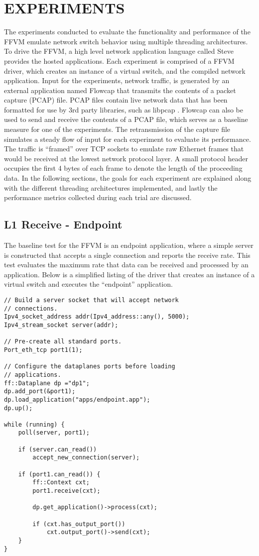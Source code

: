 \chapter{EXPERIMENTS}
\label{expr}
The experiments conducted to evaluate the functionality and performance of
the FFVM emulate network switch behavior using multiple threading architectures.
To drive the FFVM, a high level network application language called Steve
\cite{steve, steve2}
provides the hosted applications. Each experiment is comprised of a FFVM
driver, which creates an instance of a virtual switch, and the compiled network
application. Input for the experiments, network traffic, is generated by an
external application named Flowcap that transmits the contents of a packet
capture (PCAP) file. PCAP files contain live network data that has been
formatted for use by 3rd party libraries, such as libpcap \cite{pcap}.
Flowcap can also be used to send and receive the contents of a PCAP file,
which serves
as a baseline measure for one of the experiments. The retransmission of
the capture file simulates a steady flow of input for each experiment to
evaluate its performance. The traffic is ``framed'' over TCP sockets to
emulate raw Ethernet frames that would be received at the lowest network
protocol layer. A small protocol header occupies the first 4 bytes of each
frame to denote the length of the proceeding data. In the following sections,
the goals for each experiment are explained along with the different threading
architectures implemented, and lastly the performance metrics collected during
each trial are discussed.

\section{L1 Receive - Endpoint}
\label{expr:endpoint}
The baseline test for the FFVM is an endpoint application, where a simple
server is constructed that accepts a single connection and reports the
receive rate. This test evaluates the maximum rate that data can be received
and processed by an application. Below is a simplified listing of the driver
that creates an instance of a virtual switch and executes the ``endpoint''
application.

\begin{lstlisting}
// Build a server socket that will accept network
// connections.
Ipv4_socket_address addr(Ipv4_address::any(), 5000);
Ipv4_stream_socket server(addr);

// Pre-create all standard ports.
Port_eth_tcp port1(1);

// Configure the dataplanes ports before loading
// applications.
ff::Dataplane dp ="dp1";
dp.add_port(&port1);
dp.load_application("apps/endpoint.app");
dp.up();

while (running) {
	poll(server, port1);

	if (server.can_read())
		accept_new_connection(server);

	if (port1.can_read()) {
		ff::Context cxt;
		port1.receive(cxt);

		dp.get_application()->process(cxt);

		if (cxt.has_output_port())
			cxt.output_port()->send(cxt);
	}
}
\end{lstlisting}


